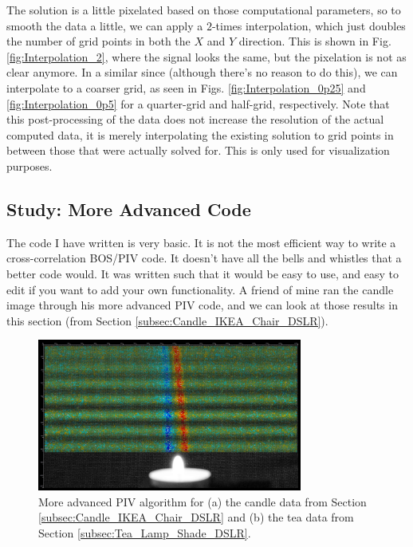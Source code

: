\documentclass[letterpaper,12pt]{article}
\begin{document}
The solution is a little pixelated based on those computational parameters, so to smooth the data a little, we can apply a $2$-times interpolation, which just doubles the number of grid points in both the $X$ and $Y$ direction.  This is shown in Fig. \ref{fig:Interpolation_2}, where the signal looks the same, but the pixelation is not as clear anymore.  In a similar since (although there's no reason to do this), we can interpolate to a coarser grid, as seen in Figs. \ref{fig:Interpolation_0p25} and \ref{fig:Interpolation_0p5} for a quarter-grid and half-grid, respectively.  Note that this post-processing of the data does not increase the resolution of the actual computed data, it is merely interpolating the existing solution to grid points in between those that were actually solved for.  This is only used for visualization purposes.

\subsection{Study: More Advanced Code}
\label{subsec:Study_More_Advanced_Code}

The code I have written is very basic.  It is not the most efficient way to write a cross-correlation BOS/PIV code.  It doesn't have all the bells and whistles that a better code would.  It was written such that it would be easy to use, and easy to edit if you want to add your own functionality.  A friend of mine ran the candle image through his more advanced PIV code, and we can look at those results in this section (from Section \ref{subsec:Candle_IKEA_Chair_DSLR}).

\begin{figure}[h]
    \centering
	\includegraphics[height=5cm]{Tim_Candle.PNG}
    \caption{More advanced PIV algorithm for (a) the candle data from Section \ref{subsec:Candle_IKEA_Chair_DSLR} and (b) the tea data from Section \ref{subsec:Tea_Lamp_Shade_DSLR}.}
    \label{fig:Tim_Candle}
\end{figure}
\end{document}
